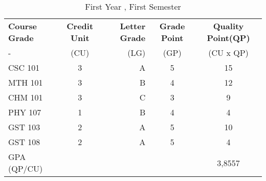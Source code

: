 \documentclass{article}
\begin{document}
	\begin{table}[h!]
		\begin{center}
			\caption{First Year , First Semester}
			\label{tab:Table 1}
			\begin{tabular}{l|c|r|c|c}
				\textbf{Course Grade} &\textbf{Credit Unit} &\textbf{Letter Grade} & 
				 \textbf{Grade Point} & \textbf{Quality Point(QP)}\\
				- & (CU) & (LG) & (GP)&  (CU x QP)\\
					\hline
					CSC 101 & 3 & A & 5  &15\\
					MTH 101 & 3 & B & 4 & 12\\
					CHM 101 & 3 & C & 3& 9\\
					PHY 107 & 1 & B & 4 & 4\\
					GST 103 & 2 & A & 5 & 10\\
					GST 108 & 2 & A & 5 & 4\\%
					GPA (QP/CU) & & &    &3,8557\\%
				
			\end{tabular}
		\end{center}
	\end{table}
\end{document}

